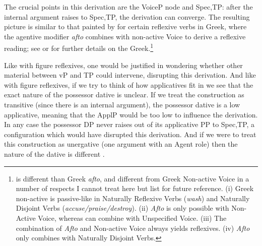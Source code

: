 

\vspace{2em}

The crucial points in this derivation are the VoiceP node and Spec,TP: after the internal argument raises to Spec,TP, the derivation can converge. The resulting picture is similar to that painted by \cite{spathasetal15} for certain reflexive verbs in Greek, where the agentive modifier \emph{afto} combines with non-active Voice to derive a reflexive reading; see \cite{spathasetal15} or \cite{kastner17gjgl} for further details on the Greek.\footnote{{\va} is different than Greek \emph{afto}, and {\vz} different from Greek Non-active Voice in a number of respects I cannot treat here but list for future reference. (i) Greek non-active is passive-like in Naturally Reflexive Verbs (\emph{wash}) and Naturally Disjoint Verbs (\emph{accuse/praise/destroy}). (ii) \emph{Afto} is only possible with Non-Active Voice, whereas {\va} can combine with Unspecified Voice. (iii) The combination of \emph{Afto} and Non-active Voice always yields reflexives. (iv) \emph{Afto} only combines with Naturally Disjoint Verbs.}

Like with figure reflexives, one would be justified in wondering whether other material between vP and TP could intervene, disrupting this derivation. And like with figure reflexives, if we try to think of how applicatives fit in we see that the exact nature of the possessor dative is unclear. If we treat the construction as transitive (since there is an internal argument), the possessor dative is a low applicative, meaning that the ApplP would be too low to influence the derivation. In any case the possessor DP never raises out of its applicative PP to Spec,TP, a configuration which would have disrupted this derivation. And if we were to treat this construction as unergative (one argument with an Agent role) then the nature of the dative is different \citep{barashersiegalboneh15,barashersiegalboneh16}.

